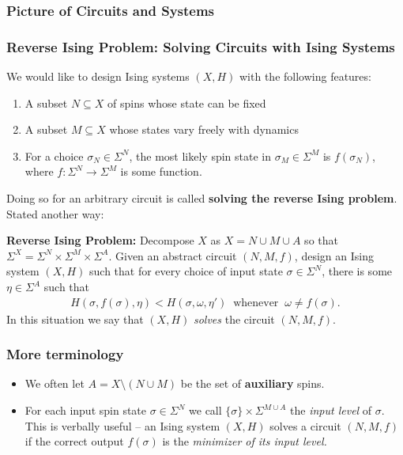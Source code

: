 \documentclass[8pt, mathserif, notheorems]{beamer}
\begin{document}
\begin{frame}\frametitle{Picture of Circuits and Systems}
  
\end{frame}
\begin{frame}[t]\frametitle{Reverse Ising Problem: Solving Circuits with Ising Systems}
We would like to design Ising systems $(X,H)$ with the following features:
\begin{enumerate}[(1)]
  \item A subset $N \subseteq X$ of spins whose state can be fixed
  \item A subset $M \subseteq X$ whose states vary freely with dynamics
  \item For a choice $\sigma_N \in \Sigma^N$, the most likely spin state in $\sigma_M \in \Sigma^M$ is $f(\sigma_N)$, where $f: \Sigma^N \to \Sigma^M$ is some function.
\end{enumerate}

Doing so for an arbitrary circuit is called \textbf{solving the reverse Ising problem}. Stated another way:
\bigskip

\textbf{Reverse Ising Problem:} Decompose $X$ as $X = N \cup M \cup A$ so that $\Sigma^X = \Sigma^N \times \Sigma^M\times \Sigma^A$. Given an abstract circuit $(N,M,f)$, design an Ising system $(X,H)$ such that for every choice of input state $\sigma \in \Sigma^N$, there is some $\eta \in \Sigma^A$ such that
\begin{align*}
  H(\sigma, f(\sigma), \eta) < H(\sigma, \omega, \eta') ~ \text{ whenever } ~ \omega \neq f(\sigma).
\end{align*}
In this situation we say that $(X,H)$ \textit{solves} the circuit $(N,M,f)$.
\end{frame}
\begin{frame}[c]\frametitle{More terminology}
  \begin{itemize}
    \item We often let $A = X \setminus (N\cup M)$ be the set of \textbf{auxiliary} spins.

      \bigskip

    \item For each input spin state $\sigma \in \Sigma^N$ we call $\{\sigma\} \times \Sigma^{M \cup A}$ the \textit{input level} of $\sigma$. This is verbally useful -- an Ising system $(X,H)$ solves a circuit $(N,M,f)$ if the correct output $f(\sigma)$ is the \textit{minimizer of its input level.}
  \end{itemize}
\end{frame}
\end{document}
